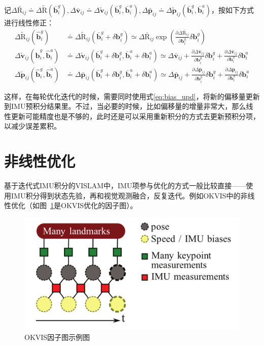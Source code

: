 记$\Delta\bar{\mathrm R}_{ij}\doteq\Delta\tilde{\mathrm R}(\bar{\bm b}^g_i), \Delta\bar{\bm v}_{ij}\doteq\Delta\tilde{\bm v}_{ij}(\bar{\bm b}^g_i,\bar{\bm b}^a_i), \Delta\bar{\bm p}_{ij}\doteq\Delta\tilde{\bm p}_{ij}(\bar{\bm b}^g_i,\bar{\bm b}^a_i)$，按如下方式进行线性修正：
\begin{equation}
\begin{aligned}
    \Delta\tilde{\mathrm R}_{ij}(\hat{\bm b}_i^g)
    &\doteq \Delta\tilde{\mathrm R}_{ij}(\bar{\bm b}^g_i + \delta\bm{b}^g_i)
    \simeq \Delta\bar{\mathrm R}_{ij}
    \exp\left(
      \tfrac{\partial\Delta\bar{\mathrm R}_{ij}}{\partial\bm{b}^g_i}
      \delta\bm{b}^g_i
    \right) \\
    \Delta\tilde{\bm v}_{ij}(\hat{\bm b}^g_i,\hat{\bm b}^a_i)
    &\doteq \Delta\tilde{\bm v}_{ij}(
    \bar{\bm b}^g_i + \delta\bm{b}^g_i,
    \bar{\bm b}^a_i + \delta\bm{b}^a_i)
    \simeq \Delta\bar{\bm v}_{ij} +
    \tfrac{\partial\Delta\bar{\bm v}_{ij}}{\partial\bm{b}^g_i}
    \delta\bm{b}^g_i +
    \tfrac{\partial\Delta\bar{\bm v}_{ij}}{\partial\bm{b}^a_i}
    \delta\bm{b}^a_i \\
    \Delta\tilde{\bm p}_{ij}(\hat{\bm b}^g_i,\hat{\bm b}^a_i)
    &\doteq \Delta\bar{\bm p}_{ij}(
    \bar{\bm b}^g_i + \delta\bm{b}^g_i,
    \bar{\bm b}^a_i + \delta\bm{b}^a_i)
    \simeq \Delta\bar{\bm p}_{ij} +
    \tfrac{\partial\Delta\bar{\bm p}_{ij}}{\partial\bm{b}^g_i}
    \delta\bm{b}^g_i +
    \tfrac{\partial\Delta\bar{\bm p}_{ij}}{\partial\bm{b}^a_i}
    \delta\bm{b}^a_i
\end{aligned}
\label{eq:bias_upd}
\end{equation}

这样，在每轮优化迭代的时候，需要同时使用式\eqref{eq:bias_upd}，将新的偏移量更新到IMU预积分结果里。不过，当必要的时候，比如偏移量的增量非常大，那么线性更新可能精度也是不够的，此时还是可以采用重新积分的方式去更新预积分项，以减少误差累积。

\section{非线性优化}

基于迭代式IMU积分的VISLAM中，IMU项参与优化的方式一般比较直接——使用IMU积分得到状态先验，再和视觉观测融合，反复迭代。例如OKVIS中的非线性优化（如图~\ref{fig:okvis}是OKVIS优化的因子图）。

\begin{figure}[htb!]
    \centering
    \includegraphics[width=.5\textwidth]{./figs/okvis.png}
    \caption{OKVIS因子图示例图\citep{leutenegger2015keyframe}}
    \label{fig:okvis}
\end{figure}

